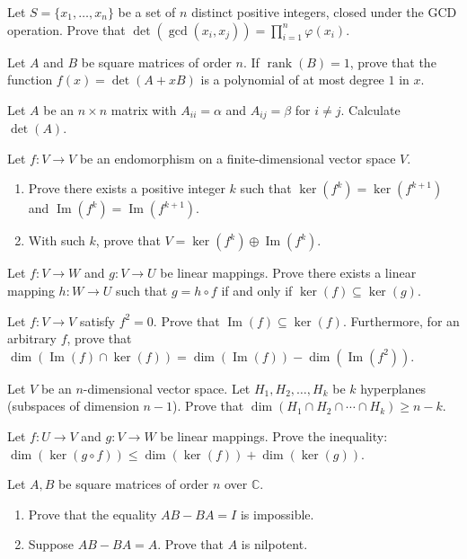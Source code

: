 \documentclass[12pt]{article}
\begin{document}
\begin{problems}
\item Let $S=\{x_1,\dots,x_n\}$ be a set of $n$ distinct positive integers, closed under the GCD operation. Prove that $\det(\gcd(x_i,x_j)) = \prod_{i=1}^n \varphi(x_i)$.

\item Let $A$ and $B$ be square matrices of order $n$. If $\operatorname{rank}(B)=1$, prove that the function $f(x)=\det(A+xB)$ is a polynomial of at most degree $1$ in $x$.

\item Let $A$ be an $n\times n$ matrix with $A_{ii}=\alpha$ and $A_{ij}=\beta$ for $i\ne j$. Calculate $\det(A)$.

\item Let $f:V\to V$ be an endomorphism on a finite-dimensional vector space $V$.
\begin{enumerate}[label=(\alph*)]
\item Prove there exists a positive integer $k$ such that $\ker(f^k)=\ker(f^{k+1})$ and $\operatorname{Im}(f^k)=\operatorname{Im}(f^{k+1})$.
\item With such $k$, prove that $V=\ker(f^k)\oplus \operatorname{Im}(f^k)$.
\end{enumerate}

\item Let $f:V\to W$ and $g:V\to U$ be linear mappings. Prove there exists a linear mapping $h:W\to U$ such that $g=h\circ f$ if and only if $\ker(f)\subseteq \ker(g)$.

\item Let $f:V\to V$ satisfy $f^2=0$. Prove that $\operatorname{Im}(f)\subseteq \ker(f)$. Furthermore, for an arbitrary $f$, prove that $\dim(\operatorname{Im}(f)\cap \ker(f)) = \dim(\operatorname{Im}(f))-\dim(\operatorname{Im}(f^2))$.

\item Let $V$ be an $n$-dimensional vector space. Let $H_1,H_2,\dots,H_k$ be $k$ hyperplanes (subspaces of dimension $n-1$). Prove that $\dim(H_1\cap H_2\cap\cdots\cap H_k) \ge n-k$.

\item Let $f:U\to V$ and $g:V\to W$ be linear mappings. Prove the inequality: $\dim(\ker(g\circ f)) \le \dim(\ker(f))+\dim(\ker(g))$.

\item Let $A,B$ be square matrices of order $n$ over $\mathbb{C}$.
\begin{enumerate}[label=(\alph*)]
\item Prove that the equality $AB-BA=I$ is impossible.
\item Suppose $AB-BA=A$. Prove that $A$ is nilpotent.
\end{enumerate}


\end{problems}
\end{document}
